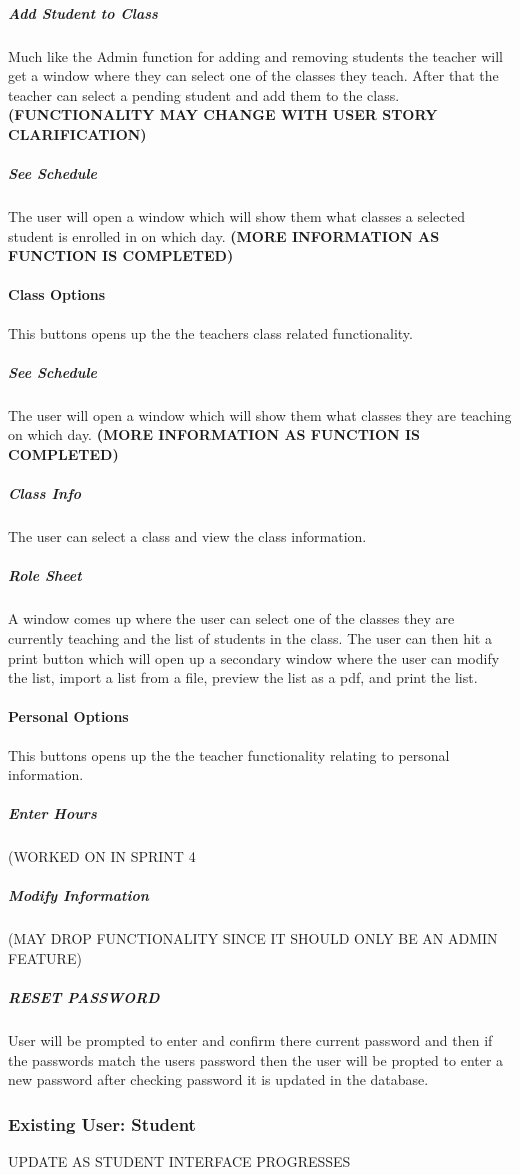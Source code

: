 \subparagraph{Add Student to Class}
Much like the Admin function for adding and removing students the teacher will get a window where they can select one of the classes they teach. After that the teacher can select a pending student and add them to the class.
\bf(FUNCTIONALITY MAY CHANGE WITH USER STORY CLARIFICATION)

\subparagraph{See Schedule}
The user will open a window which will show them what classes a selected student is enrolled in on which day.
\bf (MORE INFORMATION AS FUNCTION IS COMPLETED)

\paragraph{Class Options}
This buttons opens up the the teachers class related functionality.

\subparagraph{See Schedule}
The user will open a window which will show them what classes they are teaching on which day.
\bf (MORE INFORMATION AS FUNCTION IS COMPLETED)

\subparagraph{Class Info}
The user can select a class and view the class information.

\subparagraph{Role Sheet}
A window comes up where the user can select one of the classes they are currently teaching and the list of students in the class. The user can then hit a print button which will open up a secondary window where the user can modify the list, import a list from a file, preview the list as a pdf, and print the list.

\paragraph{Personal Options}
This buttons opens up the the teacher functionality relating to personal information.

\subparagraph{Enter Hours}
(WORKED ON IN SPRINT 4

\subparagraph{Modify Information}
(MAY DROP FUNCTIONALITY SINCE IT SHOULD ONLY BE AN ADMIN FEATURE)

\subparagraph{RESET PASSWORD}
User will be prompted to enter and confirm there current password and then if the passwords match the users password then the user will be propted to enter a new password after checking password it is updated in the database.

\subsubsection{Existing User: Student}
UPDATE AS STUDENT INTERFACE PROGRESSES







